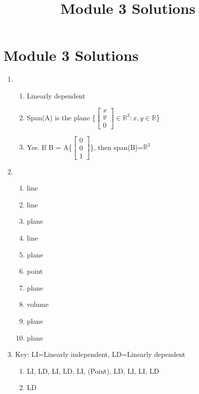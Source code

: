\documentclass{article}
\title{Module 3 Solutions}
\begin{document}
\section*{Module 3 Solutions}
\begin{solution}
    \begin{enumerate}
        \item 
            \begin{enumerate}
                \item Linearly dependent
                \item Span(A) is the plane \{$\begin{bmatrix}x \\y \\0 \end{bmatrix}\in\mathbb{R}^{3}: x,y\in\mathbb{R}$\}
                \item Yes. If B = A\cup\{$\begin{bmatrix}0\\0\\1\end{bmatrix}$\}, then span(B)=$\mathbb{R}^{3}$
            \end{enumerate}
        \item 
            \begin{enumerate}
                \item line
                \item line
                \item plane
                \item line
                \item plane
                \item point
                \item plane
                \item volume
                \item plane
                \item plane
            \end{enumerate}
        \item Key: LI=Linearly independent, LD=Linearly dependent
            \begin{enumerate}
                \item LI, LD, LI, LD, LI, (Point), LD, LI, LI, LD
                \item LD

\end{enumerate}
\end{enumerate}
\end{solution}
\end{document}
